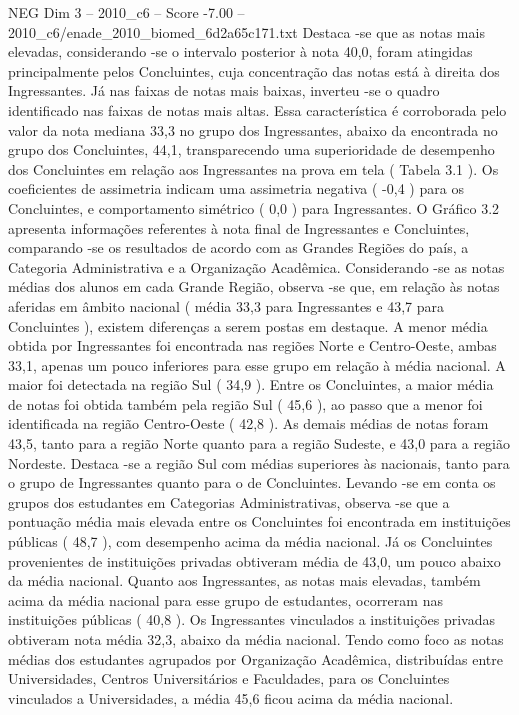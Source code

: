 \begin{textsample}{NEG Dim 3 – 2010\_c6 – Score -7.00 – 2010\_c6/enade\_2010\_biomed\_6d2a65c171.txt}
Destaca -se que as notas mais elevadas, considerando -se o intervalo posterior à nota 40,0, foram atingidas principalmente pelos Concluintes, cuja concentração das notas está à direita dos Ingressantes.
Já nas faixas de notas mais baixas, inverteu -se o quadro identificado nas faixas de notas mais altas.
Essa característica é corroborada pelo valor da nota mediana 33,3 no grupo dos Ingressantes, abaixo da encontrada no grupo dos Concluintes, 44,1, transparecendo uma superioridade de desempenho dos Concluintes em relação aos Ingressantes na prova em tela ( Tabela 3.1 ).
Os coeficientes de assimetria indicam uma assimetria negativa ( -0,4 ) para os Concluintes, e comportamento simétrico ( 0,0 ) para Ingressantes.
O Gráfico 3.2 apresenta informações referentes à nota final de Ingressantes e Concluintes, comparando -se os resultados de acordo com as Grandes Regiões do país, a Categoria Administrativa e a Organização Acadêmica.
Considerando -se as notas médias dos alunos em cada Grande Região, observa -se que, em relação às notas aferidas em âmbito nacional ( média 33,3 para Ingressantes e 43,7 para Concluintes ), existem diferenças a serem postas em destaque.
A menor média obtida por Ingressantes foi encontrada nas regiões Norte e Centro-Oeste, ambas 33,1, apenas um pouco inferiores para esse grupo em relação à média nacional.
A maior foi detectada na região Sul ( 34,9 ).
Entre os Concluintes, a maior média de notas foi obtida também pela região Sul ( 45,6 ), ao passo que a menor foi identificada na região Centro-Oeste ( 42,8 ).
As demais médias de notas foram 43,5, tanto para a região Norte quanto para a região Sudeste, e 43,0 para a região Nordeste.
Destaca -se a região Sul com médias superiores às nacionais, tanto para o grupo de Ingressantes quanto para o de Concluintes.
Levando -se em conta os grupos dos estudantes em Categorias Administrativas, observa -se que a pontuação média mais elevada entre os Concluintes foi encontrada em instituições públicas ( 48,7 ), com desempenho acima da média nacional.
Já os Concluintes provenientes de instituições privadas obtiveram média de 43,0, um pouco abaixo da média nacional.
Quanto aos Ingressantes, as notas mais elevadas, também acima da média nacional para esse grupo de estudantes, ocorreram nas instituições públicas ( 40,8 ).
Os Ingressantes vinculados a instituições privadas obtiveram nota média 32,3, abaixo da média nacional.
Tendo como foco as notas médias dos estudantes agrupados por Organização Acadêmica, distribuídas entre Universidades, Centros Universitários e Faculdades, para os Concluintes vinculados a Universidades, a média 45,6 ficou acima da média nacional.

\end{textsample}
